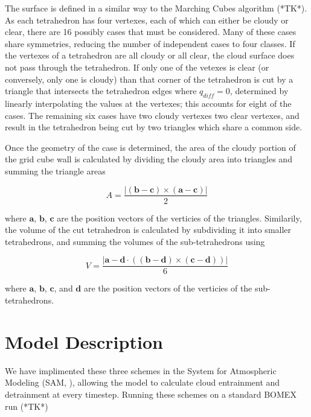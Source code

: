 \documentclass[12pt]{article}
\begin{document}
The surface is defined in a similar way to the Marching Cubes algorithm 
(*TK*).  As each tetrahedron has four vertexes, each of which can either be 
cloudy or clear, there are 16 possibly cases that must be considered.  Many of 
these cases share symmetries, reducing the number of independent cases to four 
classes.  If the vertexes of a tetrahedron are all cloudy or all clear, the 
cloud surface does not pass through the tetrahedron.  If only one of the 
vetexes is clear (or conversely, only one is cloudy) than that corner of the 
tetrahedron is cut by a triangle that intersects the tetrahedron edges where 
$q_{diff}=0$, determined by linearly interpolating the values at the vertexes; 
this accounts for eight of the cases.  The remaining six cases have two cloudy 
vertexes two clear vertexes, and result in the tetrahedron being cut by two 
triangles which share a common side.

Once the geometry of the case is determined, the area of the cloudy portion of
the grid cube wall is calculated by dividing the cloudy area into triangles and 
summing the triangle areas

\begin{equation}
A = \frac{|(\mathbf{b - c}) \times (\mathbf{a - c})|}{2}
\end{equation}

where $\mathbf{a}$, $\mathbf{b}$, $\mathbf{c}$ are the position vectors of the 
verticies of the triangles.  Similarily, the volume of the cut tetrahedron is 
calculated by subdividing it into smaller tetrahedrons, and summing the volumes 
of the sub-tetrahedrons using

\begin{equation}
V = \frac{|\mathbf{a - d} \cdot ((\mathbf{b - d}) \times (\mathbf{c - d}))|}{6}
\end{equation}

where $\mathbf{a}$, $\mathbf{b}$, $\mathbf{c}$, and $\mathbf{d}$ are the 
position vectors of the verticies of the sub-tetrahedrons.

\section{Model Description}

We have implimented these three schemes in the System for Atmospheric Modeling 
(SAM, \cite{Khairoutdinov2003}), allowing the model to calculate cloud 
entrainment and detrainment at every timestep.  Running these schemes on a 
standard BOMEX run (*TK*)
\end{document}
